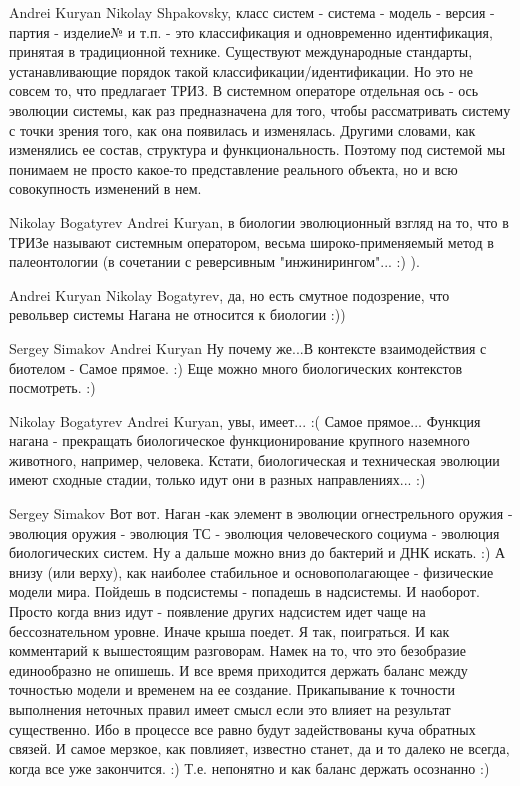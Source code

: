 \documentclass[11pt,a4paper]{article}
\begin{document}
Andrei Kuryan Nikolay Shpakovsky, класс систем - система - модель - версия -
партия - изделие№ и т.п. - это классификация и одновременно идентификация,
принятая в традиционной технике. Существуют международные стандарты,
устанавливающие порядок такой классификации/идентификации.  Но это не совсем
то, что предлагает ТРИЗ.  В системном операторе отдельная ось - ось эволюции
системы, как раз предназначена для того, чтобы рассматривать систему с точки
зрения того, как она появилась и изменялась. Другими словами, как изменялись
ее состав, структура и функциональность.  Поэтому под системой мы понимаем не
просто какое-то представление реального объекта, но и всю совокупность
изменений в нем.

Nikolay Bogatyrev Andrei Kuryan, в биологии эволюционный взгляд на то, что в
ТРИЗе называют системным оператором, весьма широко-применяемый метод в
палеонтологии (в сочетании с реверсивным "инжинирингом"... :) ).  

Andrei Kuryan Nikolay Bogatyrev, да, но есть смутное подозрение, что револьвер
системы Нагана не относится к биологии :))

Sergey Simakov Andrei Kuryan Ну почему же...В контексте взаимодействия с
биотелом - Самое прямое. :) Еще можно много биологических контекстов
посмотреть. :)

Nikolay Bogatyrev Andrei Kuryan, увы, имеет... :( Самое прямое... Функция
нагана - прекращать биологическое функционирование крупного наземного
животного, например, человека.  Кстати, биологическая и техническая эволюции
имеют сходные стадии, только идут они в разных направлениях... :)

Sergey Simakov Вот вот. Наган -как элемент в эволюции огнестрельного оружия -
эволюция оружия - эволюция ТС - эволюция человеческого социума - эволюция
биологических систем. Ну а дальше можно вниз до бактерий и ДНК искать. :) А
внизу (или верху), как наиболее стабильное и основополагающее - физические
модели мира.  Пойдешь в подсистемы - попадешь в надсистемы. И наоборот. Просто
когда вниз идут - появление других надсистем идет чаще на бессознательном
уровне. Иначе крыша поедет.  Я так, поиграться. И как комментарий к
вышестоящим разговорам. Намек на то, что это безобразие единообразно не
опишешь. И все время приходится держать баланс между точностью модели и
временем на ее создание. Прикапывание к точности выполнения неточных правил
имеет смысл если это влияет на результат существенно. Ибо в процессе все равно
будут задействованы куча обратных связей. И самое мерзкое, как повлияет,
известно станет, да и то далеко не всегда, когда все уже закончится. :)
Т.е. непонятно и как баланс держать осознанно :)
\end{document}
